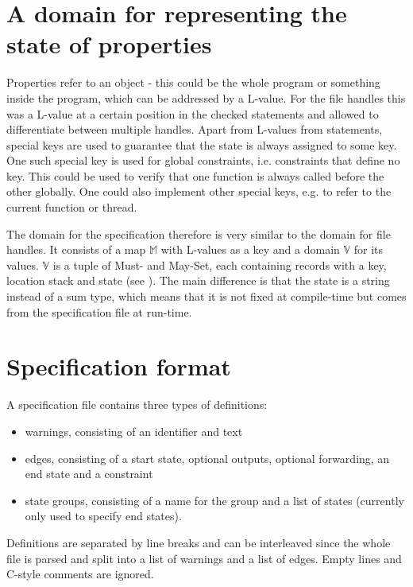 \section{A domain for representing the state of properties}
Properties refer to an object - this could be the whole program or something inside the program, which can be addressed by a L-value. For the file handles this was a L-value at a certain position in the checked statements and allowed to differentiate between multiple handles.
Apart from L-values from statements, special keys are used to guarantee that the state is always assigned to some key.
One such special key is used for global constraints, i.e. constraints that define no key. This could be used to verify that one function is always called before the other globally. One could also implement other special keys, e.g. to refer to the current function or thread.

The domain for the specification therefore is very similar to the domain for file handles. It consists of a map $\mathbb{M}$ with L-values as a key and a domain $\mathbb{V}$ for its values. $\mathbb{V}$ is a tuple of Must- and May-Set, each containing records with a key, location stack and state (see ).
The main difference is that the state is a string instead of a sum type, which means that it is not fixed at compile-time but comes from the specification file at run-time.


\section{Specification format}
A specification file contains three types of definitions:
\begin{itemize}
\item warnings, consisting of an identifier and text
\item edges, consisting of a start state, optional outputs, optional forwarding, an end state and a constraint
\item state groups, consisting of a name for the group and a list of states (currently only used to specify end states).
\end{itemize}
Definitions are separated by line breaks and can be interleaved since the whole file is parsed and split into a list of warnings and a list of edges. Empty lines and C-style comments are ignored.

